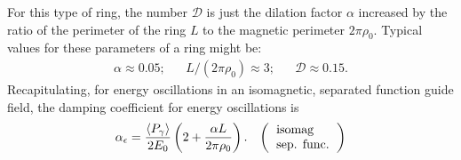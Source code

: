 For this type of ring, the number $\mathscr{D}$ is just the dilation factor $\alpha$ increased by the ratio of the perimeter of the ring $L$ to the magnetic perimeter $2\pi\rho_0$. Typical values for these parameters of a ring might be:
\begin{align*}
	\alpha \approx 0.05; && L/(2\pi\rho_0)\approx 3; && \mathscr{D} \approx 0.15.
\end{align*}
Recapitulating, for energy oscillations in an isomagnetic, separated function guide field, the damping coefficient for energy oscillations is
\begin{align}
	\alpha_\epsilon = \dfrac{\mean{P_\gamma}}{2E_0}\left( 2 + \dfrac{\alpha L}{2 \pi \rho_0} \right). && \left(\begin{tabular}{l}
\text{isomag} \\
\text{sep. func.}
\end{tabular}\right)
\end{align}

